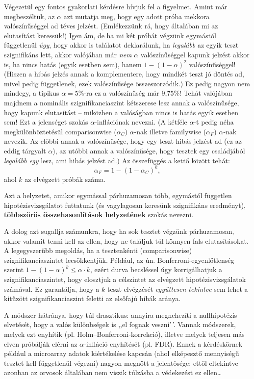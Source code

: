 \documentclass[
]{book}
\begin{document}
Végezetül egy fontos gyakorlati kérdésre hívjuk fel a figyelmet. Amint már megbeszéltük, az \(\alpha\) azt mutatja meg, hogy egy adott próba mekkora valószínűséggel ad téves jelzést. (Emlékezzünk rá, hogy általában mi az elutasítást keressük!) Igen ám, de ha mi két próbát végzünk egymástól függetlenül \emph{úgy}, hogy akkor is találatot deklarálunk, ha \emph{legalább} az egyik teszt szignifikáns lett, akkor valójában már \emph{nem} \(\alpha\) valószínűséggel kapunk jelzést akkor is, ha nincs hatás (egyik esetben sem), hanem \(1-\left(1-\alpha\right)^2\) valószínűséggel! (Hiszen a hibás jelzés annak a komplementere, hogy mindkét teszt jó döntés ad, mivel pedig függetlenek, ezek valószínűsége összeszorzódik.) Ez pedig nagyon nem mindegy, a tipikus \(\alpha=5\)\%-ra ez a valószínűség már 9,75\%! Tehát valójában majdnem a nominális szignifikanciaszint kétszerese lesz annak a valószínűsége, hogy kapunk elutasítást -- miközben a valóságban nincs is hatás egyik esetben sem! Ezt a jelenséget szokás \(\alpha\)-inflációnak nevezni. (A kétféle \(\alpha\)-t pedig néha megkülönböztetésül comparisonwise (\(\alpha_C\)) \(\alpha\)-nak illetve familywise (\(\alpha_F\)) \(\alpha\)-nak nevezik. Az előbbi annak a valószínűsége, hogy egy teszt hibás jelzést ad (ez az eddig tárgyalt \(\alpha\)), az utóbbi annak a valószínűsége, hogy tesztek egy családjából \emph{legalább egy} lesz, ami hibás jelzést ad.) Az összefüggés a kettő között tehát:
\[
    \alpha_F = 1-\left(1-\alpha_C\right)^k,
\]
ahol \(k\) az elvégzett próbák száma.

Azt a helyzetet, amikor egymással párhuzamosan több, egymástól független hipotézisvizsgálatot futtatunk (és vagylagosan keresünk szignifikáns eredményt), \textbf{többszörös összehasonlítások helyzetének} szokás nevezni.

A dolog azt sugallja számunkra, hogy ha sok tesztet végzünk párhuzamosan, akkor valamit tenni kell az ellen, hogy ne találjuk túl könnyen fals elutasításokat. A legegyszerűbb megoldás, ha a tesztenkénti (comparisonwise) szignifikanciaszintet lecsökkentjük. Például, az ún. Bonferroni-egyenlőtlenség szerint \(1-\left(1-\alpha\right)^k\leq \alpha\cdot k\), ezért durva becsléssel úgy korrigálhatjuk a szignifikanciaszintet, hogy elosztjuk a célszintet az elvégzett hipotézisvizsgálatok számával. Ez garantálja, hogy a \(k\) teszt elvégzését \emph{együttesen tekintve} sem lehet a kitűzött szignifikanciaszint feletti az elsőfajú hibák aránya.

A módszer hátránya, hogy túl drasztikus: annyira megnehezíti a nullhipotézis elvetését, hogy a valós különbségek is ,,el fognak veszni'\,'. Vannak módszerek, melyek ezt enyhítik (pl. Holm--Bonferroni-korrekció), illetve melyek teljesen más elven próbálják elérni az \(\alpha\)-infláció enyhítését (pl. FDR). Ennek a kérdéskörnek például a microarray adatok kiértékelése kapcsán (ahol elképesztő mennyiségű tesztet kell függetlenül végezni) nagyon megnőtt a jelentősége; ettől eltekintve azonban az orvosok általában nem viszik túlzásba a védekezést ez ellen\dots{}
\end{document}
